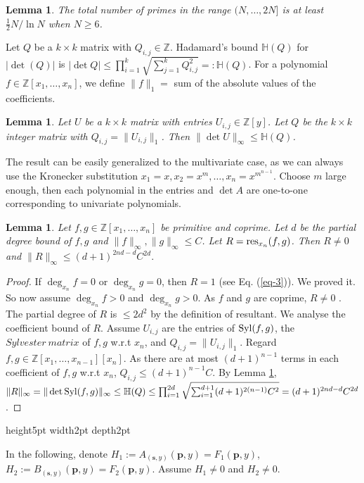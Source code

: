 \documentclass[final,20pt]{elsarticle}
\newtheorem{lemma}[theorem]{Lemma}
\def\Z{{\mathbb Z}}
\def\H{{\mathbb{H}}}
\def\res{\hbox{\rm{res}}}
\def\qed{\hfil {\vrule height5pt width2pt depth2pt}}
\begin{document}
\begin{lemma}\cite[In the proof of Th. 18.8]{GaGer13}\label{lm-3}
The total number of primes in the range $(N,\dots,2N]$ is at least $\frac12N/\ln N$ when $N\geq 6$.
\end{lemma}

Let $Q$ be a $k\times k$ matrix with $Q_{i,j}\in\Z$. Hadamard's bound $\H(Q)$ for $|\det(Q)|$ is
$|\det Q| \leq \prod_{i=1}^k \sqrt{\sum_{j=1}^kQ^2_{i,j}}=:\H(Q)$.
For a polynomial $f\in\Z[x_1,\dots,x_n]$, we define $\|f\|_1=$ sum of the absolute values of the coefficients.


\begin{lemma}\label{lm-7}\cite{lossers1974hadamard}
Let $U$ be a $k\times k$ matrix with entries $U_{i,j}\in\Z[y]$. Let $Q$ be the $k\times k$ integer matrix with $Q_{i,j}=\|U_{i,j}\|_1$. Then $\|\det U\|_\infty\leq \H(Q)$.
\end{lemma}

The result can be easily generalized to the multivariate case, as we can always use the Kronecker substitution $x_1=x,x_2=x^m,\dots,x_n=x^{m^{n-1}}$. Choose $m$ large enough, then each polynomial in the entries and $\det A$ are one-to-one corresponding to univariate polynomials.

\begin{lemma}\label{lm-5}
Let $f,g\in\Z[x_1,\dots,x_n]$ be primitive and coprime.  Let $d$ be the partial degree bound of $f,g$ and $\|f\|_{\infty},\|g\|_{\infty}\leq C$.
Let $R=\res_{x_n}(f,g)$. Then $R\neq 0$ and $\|R\|_{\infty}\leq (d+1)^{2nd-d}C^{2d}.$
\end{lemma}
\begin{proof}
If $\deg_{x_n}f=0$ or $\deg_{x_n}g=0$, then $R=1$ (see Eq. (\ref{eq-3})). We proved it. So now assume $\deg_{x_n}f>0$ and $\deg_{x_n}g>0$.
%
As $f$ and $g$ are coprime, $R\neq 0$ \cite[p288, Sylvester's Criterion]{Geddes92Algorithms}. The partial degree of $R$ is $\leq 2d^2$ by the definition of resultant. We analyse the coefficient bound of $R$. Assume $U_{i,j}$ are the entries of ${\rm Syl}(f,g)$, the $Sylvester\ matrix$ of $f,g$ w.r.t $x_n$, and $Q_{i,j}=\|U_{i,j}\|_1$. Regard $f,g\in \Z[x_1,\dots,x_{n-1}][x_n]$. As there are at most $(d+1)^{n-1}$ terms in each coefficient of $f,g$ w.r.t $x_n$, $Q_{i,j}\leq (d+1)^{n-1}C$.  By Lemma \ref{lm-7}, $\|R\|_{\infty}=\|\det{\rm Syl}(f,g)\|_{\infty}\leq \H(Q)\leq \prod_{i=1}^{2d}\sqrt{\sum_{i=1}^{d+1}(d+1)^{2(n-1)}C^2}=(d+1)^{2nd-d}C^{2d}$.
\end{proof}\qed

In the following, denote $H_1:=A_{(\mathbf{s},y)}(\mathbf{p},y)=F_1(\mathbf{p},y)$, $H_2:=B_{(\mathbf{s},y)}(\mathbf{p},y)=F_2(\mathbf{p},y)$. Assume $H_1\neq 0$ and $H_2\neq 0$. 
\end{document}
